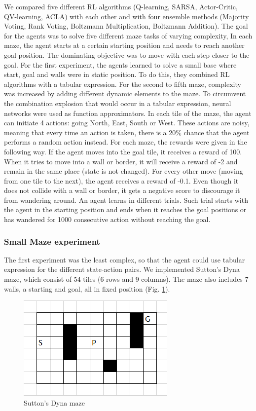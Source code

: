 We compared five different RL algorithms (Q-learning, SARSA,
Actor-Critic, QV-learning, ACLA) with each other and with four ensemble
methods (Majority Voting, Rank Voting, Boltzmann Multiplication,
Boltzmann Addition). The goal for the agents was to solve five different
maze tasks of varying complexity, In each maze, the agent starts at a
certain starting position and needs to reach another goal position. The
dominating objective was to move with each step closer to the goal. For
the first experiment, the agents learned to solve a small base where
start, goal and walls were in static position. To do this, they combined
RL algorithms with a tabular expression. For the second to fifth maze,
complexity was increased by adding different dynamic elements to the
maze. To circumvent the combination explosion that would occur in a
tabular expression, neural networks were used as function approximators.
In each tile of the maze, the agent can initiate 4 actions: going North,
East, South or West. These actions are noisy, meaning that every time an
action is taken, there is a 20\% chance that the agent performs a random
action instead. For each maze, the rewards were given in the following
way. If the agent moves into the goal tile, it receives a reward of 100.
When it tries to move into a wall or border, it will receive a reward of
-2 and remain in the same place (state is not changed). For every other
move (moving from one tile to the next), the agent receives a reward of
-0.1. Even though it does not collide with a wall or border, it gets a
negative score to discourage it from wandering around. An agent learns
in different trials. Such trial starts with the agent in the starting
position and ends when it reaches the goal positions or has wandered for
1000 consecutive action without reaching the goal.

\hypertarget{small-maze-experiment}{%
\subsubsection{Small Maze experiment}\label{small-maze-experiment}}

The first experiment was the least complex, so that the agent could use
tabular expression for the different state-action pairs. We implemented
Sutton's Dyna maze, which consist of 54 tiles (6 rows and 9 columns).
The maze also includes 7 walls, a starting and goal, all in fixed
position (Fig. \ref{simpleMaze}).

\begin{figure}
\centering
\includegraphics{img/simpleMaze.png}
\caption{Sutton's Dyna maze \label{simpleMaze}}
\end{figure}

